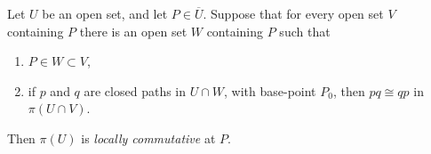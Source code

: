 Let $U$ be an open set, and let $P \in \overline{U}$. Suppose that for every open set $V$ containing $P$ there is an open set $W$ containing $P$ such that
\begin{enumerate}
\item $P \in W \subset V$,
\item if $p$ and $q$ are closed paths in $U \cap W$, with base-point $P_0$, then $pq \cong qp$ in $\pi(U \cap V)$.
\end{enumerate}
Then $\pi(U)$ is \textit{locally commutative} at $P$.
